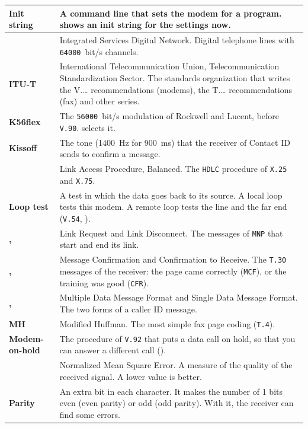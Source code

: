 \documentclass[a5paper,10pt]{article}
\makeatletter
\newcommand{\cmd}[1]{\texttt{#1}}
\newcommand{\std}[1]{\texttt{#1}}
\newcommand{\stdb}[1]{\textpdfrender{TextRenderingMode=FillStroke,
  LineWidth=0.25pt}{\texttt{#1}}}
\newcommand{\cmdl}[2][]{\hyperlink{cmd:#1}{\cmd{#2}}}
\let\cmd\@firstofone
\makeatother
\begin{document}
{\begin{longtable}{|>{\raggedright\arraybackslash}p{}|>{\raggedright\arraybackslash}p{}|}
\textbf{Init string} & A command line that sets the modem for a program.  \cmdl[bangR]{!R} shows an init string for the settings now. \\ \hline
\textbf{\stdb{ISDN}} & Integrated Services Digital Network.  Digital telephone lines with \std{64000}~bit/s channels. \\ \hline
\textbf{ITU-T} & International Telecommunication Union, Telecommunication Standardization Sector.  The standards organization that writes the V.\ldots{} recommendations (modems), the T.\ldots{} recommendations (fax) and other series. \\ \hline
\textbf{K56flex} & The \std{56000}~bit/s modulation of Rockwell and Lucent, before \std{V.90}.  \cmdl[plusMS]{+MS=56} selects it. \\ \hline
\textbf{Kissoff} & The tone (1400~Hz for 900~ms) that the receiver of Contact ID sends to confirm a message. \\ \hline
\textbf{\stdb{LAPB}} & Link Access Procedure, Balanced.  The \std{HDLC} procedure of \std{X.25} and \std{X.75}. \\ \hline
\textbf{Loop test} & A test in which the data goes back to its source.  A local loop tests this modem.  A remote loop tests the line and the far end (\std{V.54}, \cmdl[ampT]{\&T}). \\ \hline
\textbf{\stdb{LR}, \stdb{LD}} & Link Request and Link Disconnect.  The messages of \std{MNP} that start and end its link. \\ \hline
\textbf{\stdb{MCF}, \stdb{CFR}} & Message Confirmation and Confirmation to Receive.  The \std{T.30} messages of the receiver: the page came correctly (\std{MCF}), or the training was good (\std{CFR}). \\ \hline
\textbf{\stdb{MDMF}, \stdb{SDMF}} & Multiple Data Message Format and Single Data Message Format.  The two forms of a caller ID message. \\ \hline
\textbf{MH} & Modified Huffman.  The most simple fax page coding (\std{T.4}). \\ \hline
\textbf{Modem-on-hold} & The procedure of \std{V.92} that puts a data call on hold, so that you can answer a different call (\cmdl[plusPMH]{+PMH}). \\ \hline
\textbf{\stdb{NMSE}} & Normalized Mean Square Error.  A measure of the quality of the received signal.  A lower value is better. \\ \hline
\textbf{Parity} & An extra bit in each character.  It makes the number of 1 bits even (even parity) or odd (odd parity).  With it, the receiver can find some errors. \\ \hline

\end{longtable}}
\end{document}
